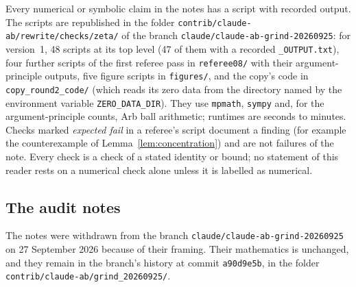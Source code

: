 Every numerical or symbolic claim in the notes has a script with recorded output. The scripts are republished in the folder \texttt{contrib/claude-ab/rewrite/checks/zeta/} of the branch \texttt{claude/claude-ab-grind-20260925}: for version~1, 48 scripts at its top level (47 of them with a recorded \texttt{\_OUTPUT.txt}), four further scripts of the first referee pass in \texttt{referee08/} with their argument-principle outputs, five figure scripts in \texttt{figures/}, and the copy's code in \texttt{copy\_round2\_code/} (which reads its zero data from the directory named by the environment variable \texttt{ZERO\_DATA\_DIR}). They use \texttt{mpmath}, \texttt{sympy} and, for the argument-principle counts, Arb ball arithmetic; runtimes are seconds to minutes. Checks marked \emph{expected fail} in a referee's script document a finding (for example the counterexample of Lemma~\ref{lem:concentration}) and are not failures of the note. Every check is a check of a stated identity or bound; no statement of this reader rests on a numerical check alone unless it is labelled as numerical.

\subsection{The audit notes}

The notes were withdrawn from the branch \texttt{claude/claude-ab-grind-20260925} on 27 September 2026 because of their framing. Their mathematics is unchanged, and they remain in the branch's history at commit \texttt{a90d9e5b}, in the folder \texttt{contrib/claude-ab/grind\_20260925/}.

